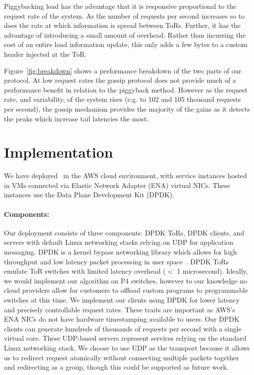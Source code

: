 Piggybacking load has the advantage that it is responsive proportional to the
request rate of the system. As the number of requests per second increases so
to does the rate at which information is spread between ToRs. Further, it has
the advantage of introducing a small amount of overhead. Rather than incurring
the cost of an entire load information update, this only adds a few bytes to a
custom header injected at the ToR.

Figure~\ref{fig:breakdown} shows a performance breakdown of the two parts of
our protocol. At low request rates the gossip protocol does not provide much of
a performance benefit in relation to the piggyback method. However as the
request rate, and variability, of the system rises (e.g. to 102 and 105
thousand requests per second), the gossip mechanism provides the majority of
the gains as it detects the peaks which increase tail latencies the most.

\section{Implementation}

We have deployed \systemname\ in the AWS cloud environment, with service
instances hosted in VMs connected via Elastic Network Adapter (ENA) virtual
NICs. These instances use the Data Plane Development Kit (DPDK).

\paragraph{Components:} Our deployment consists of three components: DPDK ToRs,
DPDK clients, and servers with default Linux networking stacks relying on UDP
for application messaging. DPDK is a kernel bypass networking library which
allows for high throughput and low latency packet processing in user
space~\cite{dpdk}. DPDK ToRs emulate ToR switches with limited latency overhead
($<$ 1 microsecond).  Ideally, we would implement our algorithm on P4 switches,
however to our knowledge no cloud providers allow for customers to offload
custom programs to programmable switches at this time.  We implement our
clients using DPDK for lower latency and precisely controllable request rates.
These traits are important as AWS's ENA NICs do not have hardware timestamping
available to users.  Our DPDK clients can generate hundreds of thousands of
requests per second with a single virtual core. These UDP-based servers
represent services relying on the standard Linux networking stack. We choose to
use UDP as the transport because it allows us to redirect request atomically
without connecting multiple packets together and redirecting as a group, though
this could be supported as future work.

